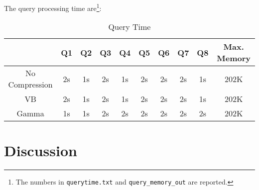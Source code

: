 \documentclass{article}
\newcommand{\tmtt}[1]{\texttt{#1}}
\begin{document}
The query processing time are{\footnote{The numbers in {\tmtt{querytime.txt}}
and {\tmtt{query\_memory\_out}} are reported.}}:

\begin{table}[h]
  \begin{tabular}{|c|c|c|c|c|c|c|c|c|c|}
    \hline
    & Q1 & Q2 & Q3 & Q4 & Q5 & Q6 & Q7 & Q8 & Max. Memory\\
    \hline
    No Compression & 2s & 1s & 2s & 1s & 2s & 2s & 2s & 1s & 202K\\
    \hline
    VB & 2s & 1s & 2s & 1s & 2s & 2s & 2s & 1s & 202K\\
    \hline
    Gamma & 1s & 1s & 2s & 2s & 2s & 2s & 2s & 2s & 202K\\
    \hline
  \end{tabular}
  \caption{Query Time}
\end{table}

\section{Discussion}
\end{document}
